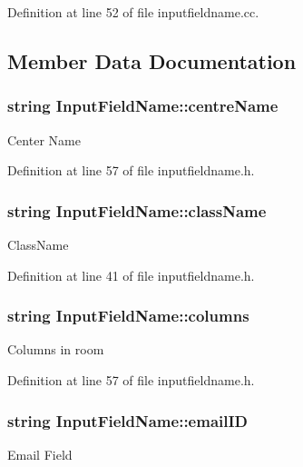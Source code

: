 Definition at line 52 of file inputfieldname.\-cc.



\subsection{Member Data Documentation}
\hypertarget{classInputFieldName_a19c67f2d38cde97f856d4ca3639f4fc7}{
\subsubsection[{centre\-Name}]{\setlength{\rightskip}{0pt plus 5cm}string Input\-Field\-Name\-::centre\-Name}}\label{classInputFieldName_a19c67f2d38cde97f856d4ca3639f4fc7}
Center Name 

Definition at line 57 of file inputfieldname.\-h.

\hypertarget{classInputFieldName_ad8b28ebeabdabb5967542e317f549280}{
\subsubsection[{class\-Name}]{\setlength{\rightskip}{0pt plus 5cm}string Input\-Field\-Name\-::class\-Name}}\label{classInputFieldName_ad8b28ebeabdabb5967542e317f549280}
Class\-Name 

Definition at line 41 of file inputfieldname.\-h.

\hypertarget{classInputFieldName_abca049f347e589f24b672c19907c5c72}{
\subsubsection[{columns}]{\setlength{\rightskip}{0pt plus 5cm}string Input\-Field\-Name\-::columns}}\label{classInputFieldName_abca049f347e589f24b672c19907c5c72}
Columns in room 

Definition at line 57 of file inputfieldname.\-h.

\hypertarget{classInputFieldName_a05541618feaaebe7a3f74b0bf8fa74b9}{
\subsubsection[{email\-I\-D}]{\setlength{\rightskip}{0pt plus 5cm}string Input\-Field\-Name\-::email\-I\-D}}\label{classInputFieldName_a05541618feaaebe7a3f74b0bf8fa74b9}
Email Field 

